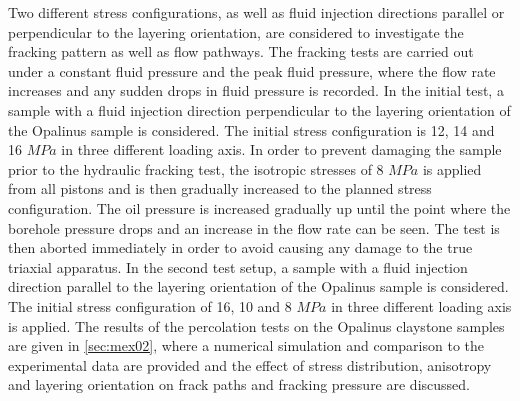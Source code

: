 Two different stress configurations, as well as fluid injection directions parallel or perpendicular to the layering orientation, are considered to investigate the fracking pattern as well as flow pathways. The fracking tests are carried out under a constant fluid pressure and the peak fluid pressure, where the flow rate increases and any sudden drops in fluid pressure is recorded. In the initial test, a sample with a fluid injection direction perpendicular to the layering orientation of the Opalinus sample is considered. The initial stress configuration is 12, 14 and 16 $MPa$ in three different loading axis. In order to prevent damaging the sample prior to the hydraulic fracking test, the isotropic stresses of 8 $MPa$ is applied from all pistons and is then gradually increased to the planned stress configuration. The oil pressure is increased gradually up until the point where the borehole pressure drops and an increase in the flow rate can be seen. The test is then aborted immediately in order to avoid causing any damage to the true triaxial apparatus. In the second test setup, a sample with a fluid injection direction parallel to the layering orientation of the Opalinus sample is considered. The initial stress configuration of 16, 10 and 8 $MPa$ in three different loading axis is applied. The results of the percolation tests on the Opalinus claystone samples are given in \ref{sec:mex02}, where a numerical simulation and comparison to the experimental data are provided and the effect of stress distribution, anisotropy and layering orientation on frack paths and fracking pressure are discussed. 
